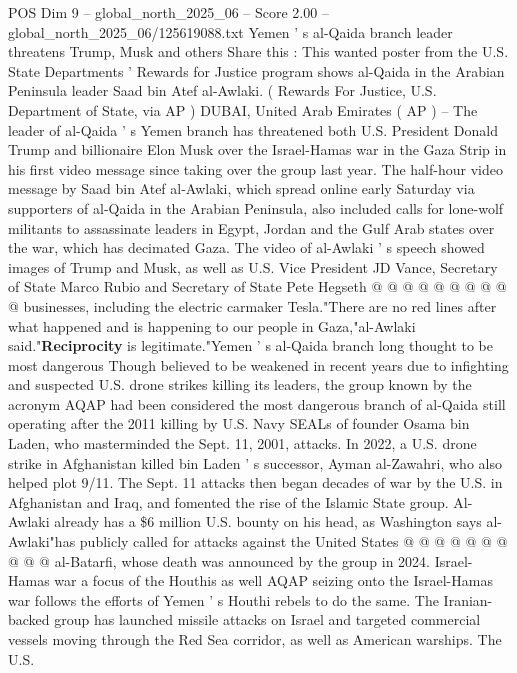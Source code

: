 \begin{textsample}{POS Dim 9 – global\_north\_2025\_06 – Score 2.00 – global\_north\_2025\_06/125619088.txt}  \label{ex:f9_pos_345}
Yemen ' s al-Qaida branch leader threatens Trump, Musk and others Share this : This wanted poster from the U.S.
State Departments ' Rewards for Justice program shows al-Qaida in the Arabian Peninsula leader Saad bin Atef al-Awlaki. ( Rewards For Justice, U.S.
Department of State, via AP ) DUBAI, United Arab Emirates ( AP ) -- The leader of al-Qaida ' s Yemen branch has threatened both U.S.
President Donald Trump and billionaire Elon Musk over the Israel-Hamas war in the Gaza Strip in his first video message since taking over the group last year.
The half-hour video message by Saad bin Atef al-Awlaki, which spread online early Saturday via supporters of al-Qaida in the Arabian Peninsula, also included calls for lone-wolf militants to assassinate leaders in Egypt, Jordan and the Gulf Arab states over the war, which has decimated Gaza.
The video of al-Awlaki ' s speech showed images of Trump and Musk, as well as U.S.
Vice President JD Vance, Secretary of State Marco Rubio and Secretary of State Pete Hegseth @ @ @ @ @ @ @ @ @ @ businesses, including the electric carmaker Tesla."There are no red lines after what happened and is happening to our people in Gaza,"al-Awlaki said."\textbf{Reciprocity} is legitimate."Yemen ' s al-Qaida branch long thought to be most dangerous Though believed to be weakened in recent years due to infighting and suspected U.S. drone strikes killing its leaders, the group known by the acronym AQAP had been considered the most dangerous branch of al-Qaida still operating after the 2011 killing by U.S.
Navy SEALs of founder Osama bin Laden, who masterminded the Sept. 11, 2001, attacks.
In 2022, a U.S. drone strike in Afghanistan killed bin Laden ' s successor, Ayman al-Zawahri, who also helped plot 9/11.
The Sept. 11 attacks then began decades of war by the U.S. in Afghanistan and Iraq, and fomented the rise of the Islamic State group.
Al-Awlaki already has a \$6 million U.S. bounty on his head, as Washington says al-Awlaki"has publicly called for attacks against the United States @ @ @ @ @ @ @ @ @ @ al-Batarfi, whose death was announced by the group in 2024.
Israel-Hamas war a focus of the Houthis as well AQAP seizing onto the Israel-Hamas war follows the efforts of Yemen ' s Houthi rebels to do the same.
The Iranian-backed group has launched missile attacks on Israel and targeted commercial vessels moving through the Red Sea corridor, as well as American warships.
The U.S.

\end{textsample}
